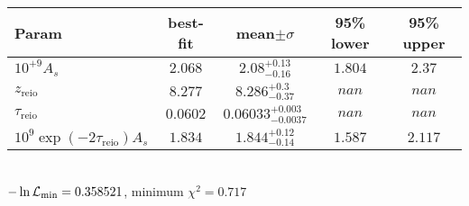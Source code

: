\begin{tabular}{|l|c|c|c|c|} 
 \hline 
Param & best-fit & mean$\pm\sigma$ & 95\% lower & 95\% upper \\ \hline 
$10^{+9}A_{s }$ &$2.068$ & $2.08_{-0.16}^{+0.13}$ & $1.804$ & $2.37$ \\ 
$z_\mathrm{reio}$ &$8.277$ & $8.286_{-0.37}^{+0.3}$ & $nan$ & $nan$ \\ 
$\tau_\mathrm{reio}$ &$0.0602$ & $0.06033_{-0.0037}^{+0.003}$ & $nan$ & $nan$ \\ 
$10^9 \exp(-2 \tau_\mathrm{reio}) A_s$ &$1.834$ & $1.844_{-0.14}^{+0.12}$ & $1.587$ & $2.117$ \\ 
\hline 
 \end{tabular} \\ 
$-\ln{\cal L}_\mathrm{min} =0.358521$, minimum $\chi^2=0.717$ \\ 

